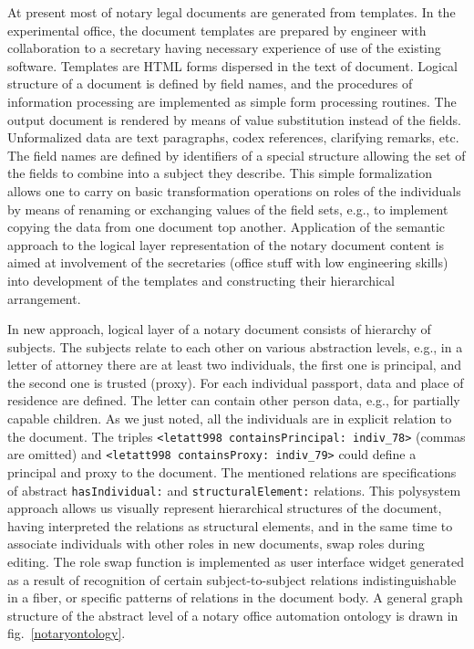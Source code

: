 \documentclass[conference]{IEEEtran}
\begin{document}
At present most of notary legal documents are generated from
templates.  In the experimental office, the document templates are
prepared by engineer with collaboration to a secretary having
necessary experience of use of the existing software.  Templates are
HTML forms dispersed in the text of document.  Logical structure of a
document is defined by field names, and the procedures of information
processing are implemented as simple form processing routines.  The
output document is rendered by means of value substitution instead of
the fields.  Unformalized data are text paragraphs, codex references,
clarifying remarks, etc.  The field names are defined by identifiers
of a special structure allowing the set of the fields to combine into
a subject they describe.  This simple formalization allows one to
carry on basic transformation operations on roles of the individuals
by means of renaming or exchanging values of the field sets, e.g., to
implement copying the data from one document top another.  Application
of the semantic approach to the logical layer representation of the
notary document content is aimed at involvement of the secretaries
(office stuff with low engineering skills) into development of the
templates and constructing their hierarchical arrangement.

In new approach, logical layer of a notary document consists of
hierarchy of subjects.  The subjects relate to each other on various
abstraction levels, e.g., in a letter of attorney there are at least
two individuals, the first one is principal, and the second one is
trusted (proxy).  For each individual passport, data and place of
residence are defined.  The letter can contain other person data,
e.g., for partially capable children.  As we just noted, all the
individuals are in explicit relation to the document.  The triples
\texttt{<letatt998 containsPrincipal: indiv\_78>} (commas are omitted)
and \texttt{<letatt998 containsProxy: indiv\_79>} could define a
principal and proxy to the document.  The mentioned relations are
specifications of abstract \texttt{hasIndividual:} and
\texttt{structuralElement:} relations.  This polysystem approach
allows us visually represent hierarchical structures of the document,
having interpreted the relations as structural elements, and in the
same time to associate individuals with other roles in new documents,
swap roles during editing.  The role swap function is implemented as
user interface widget generated as a result of recognition of certain
subject-to-subject relations indistinguishable in a fiber, or specific
patterns of relations in the document body.  A general graph structure
of the abstract level of a notary office automation ontology is drawn
in fig.~\ref{notaryontology}.
\end{document}
